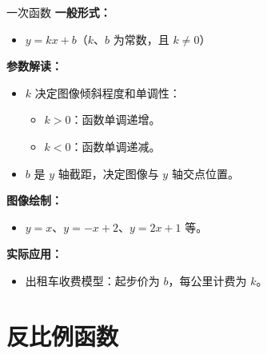 \documentclass[aspectratio=169]{ctexbeamer} %
\begin{document}
\begin{frame}{一次函数}
    \textbf{一般形式：}
    \begin{itemize}
        \item \( y = kx + b \)（\( k \)、\( b \) 为常数，且 \( k \neq 0 \)）
    \end{itemize}

    \vspace{0.5cm}
    \textbf{参数解读：}
    \begin{itemize}
        \item \( k \) 决定图像倾斜程度和单调性：
        \begin{itemize}
            \item \( k > 0 \)：函数单调递增。
            \item \( k < 0 \)：函数单调递减。
        \end{itemize}
        \item \( b \) 是 \( y \) 轴截距，决定图像与 \( y \) 轴交点位置。
    \end{itemize}

    \vspace{0.5cm}
    \textbf{图像绘制：}
    \begin{itemize}
        \item \( y = x \)、\( y = -x + 2 \)、\( y = 2x + 1 \) 等。
    \end{itemize}

    \vspace{0.5cm}
    \textbf{实际应用：}
    \begin{itemize}
        \item 出租车收费模型：起步价为 \( b \)，每公里计费为 \( k \)。
    \end{itemize}
\end{frame}

\section{反比例函数}
\end{document}
